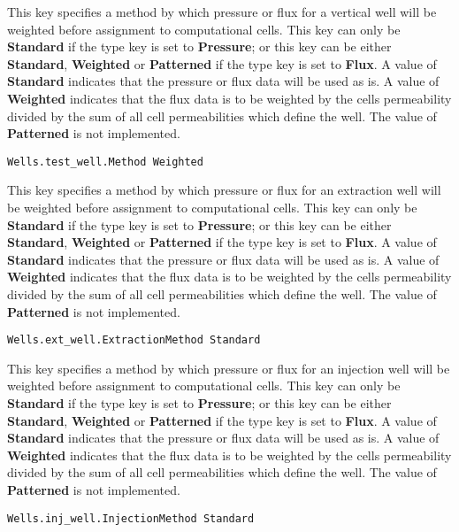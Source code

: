 {
This key specifies a method by which pressure or flux for a vertical
well will be weighted before assignment to computational cells.  This
key can only be {\bf Standard} if the type key is set to {\bf Pressure};
or this key can be either {\bf Standard}, {\bf Weighted} or
{\bf Patterned} if the type key is set to {\bf Flux}.  A value of
{\bf Standard} indicates that the pressure or flux data will be used as
is.  A value of {\bf Weighted} indicates that the flux data is to be
weighted by the cells permeability divided by the sum of all cell
permeabilities which define the well.  The value of {\bf Patterned} is
not implemented.
}
\begin{display}\begin{verbatim}
Wells.test_well.Method Weighted
\end{verbatim}\end{display}

{
This key specifies a method by which pressure or flux for an extraction
well will be weighted before assignment to computational cells.  This
key can only be {\bf Standard} if the type key is set to {\bf Pressure};
or this key can be either {\bf Standard}, {\bf Weighted} or
{\bf Patterned} if the type key is set to {\bf Flux}.  A value of
{\bf Standard} indicates that the pressure or flux data will be used as
is.  A value of {\bf Weighted} indicates that the flux data is to be
weighted by the cells permeability divided by the sum of all cell
permeabilities which define the well.  The value of {\bf Patterned} is
not implemented.
}
\begin{display}\begin{verbatim}
Wells.ext_well.ExtractionMethod Standard
\end{verbatim}\end{display}

{
This key specifies a method by which pressure or flux for an injection
well will be weighted before assignment to computational cells.  This
key can only be {\bf Standard} if the type key is set to {\bf Pressure};
or this key can be either {\bf Standard}, {\bf Weighted} or
{\bf Patterned} if the type key is set to {\bf Flux}.  A value of
{\bf Standard} indicates that the pressure or flux data will be used as
is.  A value of {\bf Weighted} indicates that the flux data is to be
weighted by the cells permeability divided by the sum of all cell
permeabilities which define the well.  The value of {\bf Patterned} is
not implemented.
}
\begin{display}\begin{verbatim}
Wells.inj_well.InjectionMethod Standard
\end{verbatim}\end{display}

